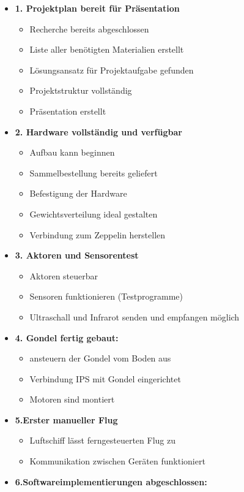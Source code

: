 \documentclass[lang=ngerman,inputenc=utf8,fontsize=10pt]{ldvarticle}
\begin{document}
\begin{itemize}
\begin{itemize}
	\item \textbf{1. Projektplan bereit für Präsentation}
		\begin{itemize}
			\item  Recherche bereits abgeschlossen
			\item  Liste aller benötigten Materialien erstellt
			\item  Lösungsansatz für Projektaufgabe gefunden
			\item  Projektstruktur vollständig
			\item  Präsentation erstellt
		\end{itemize}
	\item \textbf{2. Hardware vollständig und verfügbar}
		\begin{itemize}
			\item Aufbau kann beginnen
			\item Sammelbestellung bereits geliefert
			\item Befestigung der Hardware
			\item Gewichtsverteilung ideal gestalten
			\item Verbindung zum Zeppelin herstellen
		\end{itemize}
		\item \textbf{3. Aktoren und Sensorentest}  
		\begin{itemize}
			\item Aktoren steuerbar
			\item Sensoren funktionieren (Testprogramme)
			\item Ultraschall und Infrarot senden und empfangen möglich
		\end{itemize}
	\item \textbf{4. Gondel fertig gebaut:}
		\begin{itemize}
			\item ansteuern der Gondel vom Boden aus
			\item Verbindung IPS mit Gondel eingerichtet
			\item Motoren sind montiert
		\end{itemize}
	\item \textbf{5.Erster manueller Flug} 
		\begin{itemize}
			\item Luftschiff lässt ferngesteuerten Flug zu
			\item Kommunikation zwischen Geräten funktioniert
		\end{itemize}
	\item \textbf{6.Softwareimplementierungen abgeschlossen:} 

\end{itemize}
\end{itemize}
\end{document}
